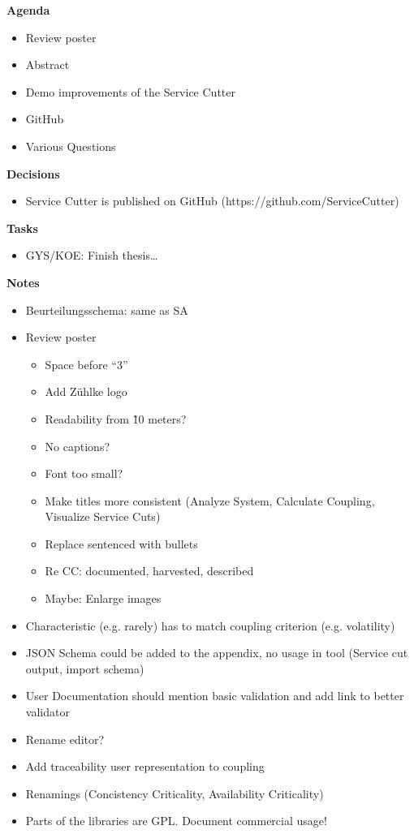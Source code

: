 \textbf{Agenda}

\begin{itemize}
\item Review poster
\item Abstract
\item Demo improvements of the Service Cutter
\item GitHub
\item Various Questions
\end{itemize}


\textbf{Decisions}

\begin{itemize}
\item Service Cutter is published on GitHub (https://github.com/ServiceCutter) 
\end{itemize}

\textbf{Tasks}

\begin{itemize}
\item GYS/KOE: Finish thesis\dots
\end{itemize}

\textbf{Notes}

\begin{itemize}
\item Beurteilungsschema: same as SA
\item Review poster
	\begin{itemize}
	\item Space before \enquote{3}
	\item Add Zühlke logo
	\item Readability from \~10 meters?
	\item No captions?
	\item Font too small?
	\item Make titles more consistent (Analyze System, Calculate Coupling, Visualize Service Cuts)
	\item Replace sentenced with bullets
	\item Re CC: documented, harvested, described
	\item Maybe: Enlarge images
	\end{itemize}
\item Characteristic (e.g. rarely) has to match coupling criterion (e.g. volatility)
\item JSON Schema could be added to the appendix, no usage in tool (Service cut output, import schema)
\item User Documentation should mention basic validation and add link to better validator
\item Rename editor?
\item Add traceability user representation to coupling
\item Renamings (Concistency Criticality, Availability Criticality)
\item Parts of the libraries are GPL. Document commercial usage!
\end{itemize}
